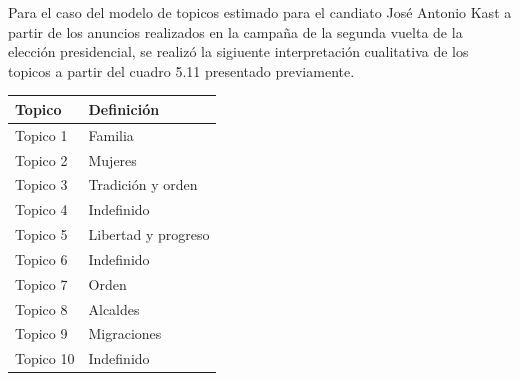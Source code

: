 \documentclass[
  10pt,
  letterpaper,
]{report}
\begin{document}
Para el caso del modelo de topicos estimado para el candiato José
Antonio Kast a partir de los anuncios realizados en la campaña de la
segunda vuelta de la elección presidencial, se realizó la sigiuente
interpretación cualitativa de los topicos a partir del cuadro 5.11
presentado previamente.

\begin{longtable}[]{@{}ll@{}}
\toprule()
Topico & Definición \\
\midrule()
\endhead
Topico 1 & Familia \\
Topico 2 & Mujeres \\
Topico 3 & Tradición y orden \\
Topico 4 & Indefinido \\
Topico 5 & Libertad y progreso \\
Topico 6 & Indefinido \\
Topico 7 & Orden \\
Topico 8 & Alcaldes \\
Topico 9 & Migraciones \\
Topico 10 & Indefinido \\
\bottomrule()
\end{longtable}
\end{document}
